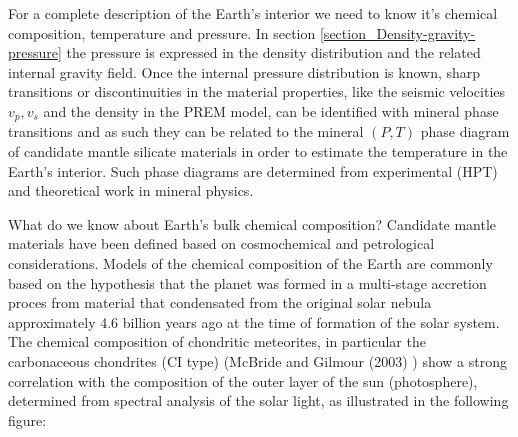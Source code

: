 For a complete description of the Earth's interior we need to know
it's chemical composition, temperature and pressure.
In section \ref{section_Density-gravity-pressure} 
the pressure is expressed in the density distribution 
and the related internal gravity field.
Once the internal pressure distribution is known,
sharp transitions or discontinuities in the material properties,
like the seismic velocities $v_p, v_s$ and the density 
in the PREM model,
can be identified with mineral phase transitions and as such they can
be related to the mineral $(P,T)$ phase diagram
of candidate mantle silicate materials in order to estimate the temperature 
in the Earth's interior.
Such phase diagrams are determined from
experimental (HPT) and theoretical work in mineral physics.

What do we know about Earth's bulk chemical composition?
Candidate mantle materials have been defined based on
cosmochemical and petrological considerations.
Models of the chemical composition of the Earth are commonly based on
the hypothesis that the planet was formed in a multi-stage accretion proces
from material that condensated from the original solar nebula
approximately 4.6 billion years ago at the time of formation of the
solar system.
The chemical composition of chondritic meteorites, in particular
the carbonaceous chondrites (CI type)
(McBride and Gilmour (2003) \cite{mcgi03})
show a strong correlation with the composition of the outer layer of
the sun (photosphere), determined from spectral analysis of the 
solar light, as illustrated in the following figure:

